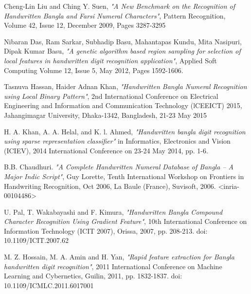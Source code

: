 \documentclass[conference]{IEEEtran}
\begin{document}
%
%
%
\begin{thebibliography}{1}

Cheng-Lin Liu and Ching Y. Suen, \emph{"A New Benchmark on the Recognition of Handwritten Bangla and Farsi Numeral Characters"}, Pattern Recognition, Volume 42, Issue 12, December 2009, Pages 3287-3295

Nibaran Das, Ram Sarkar, Subhadip Basu, Mahantapas Kundu, Mita Nasipuri, 
Dipak Kumar Basu, \emph{"A genetic algorithm based region sampling for selection of local features in handwritten digit recognition application"}, Applied Soft Computing Volume 12, Issue 5, May 2012, Pages 1592-1606.

Tasnuva Hassan, Haider Adnan Khan, \emph{"Handwritten Bangla Numeral Recognition using Local Binary Pattern"}, 2nd International Conference on Electrical Engineering and Information and Communication Technology (lCEEICT) 2015, Jahangimagar University, Dhaka-1342, Bangladesh, 21-23 May 2015

H. A. Khan, A. A. Helal, and K.  l.  Ahmed, \emph{"Handwritten bangla digit
recognition using sparse representation classifier"} in  Informatics, Electronics and Vision (ICIEV), 2014 International Conference on 23-24 May 2014, pp. 1-6.

B.B. Chaudhuri. \emph{"A Complete Handwritten Numeral Database of Bangla – A Major Indic Script"}, Guy Lorette, Tenth International Workshop on Frontiers in Handwriting Recognition, Oct 2006, La Baule (France), Suvisoft, 2006. <inria-00104486>

U. Pal, T. Wakabayashi and F. Kimura, \emph{"Handwritten Bangla Compound Character Recognition Using Gradient Feature"}, 10th International Conference on Information Technology (ICIT 2007), Orissa, 2007, pp. 208-213.
doi: 10.1109/ICIT.2007.62

M. Z. Hossain, M. A. Amin and H. Yan, \emph{"Rapid feature extraction for Bangla handwritten digit recognition"}, 2011 International Conference on Machine Learning and Cybernetics, Guilin, 2011, pp. 1832-1837.
doi: 10.1109/ICMLC.2011.6017001


\end{thebibliography}
\end{document}
